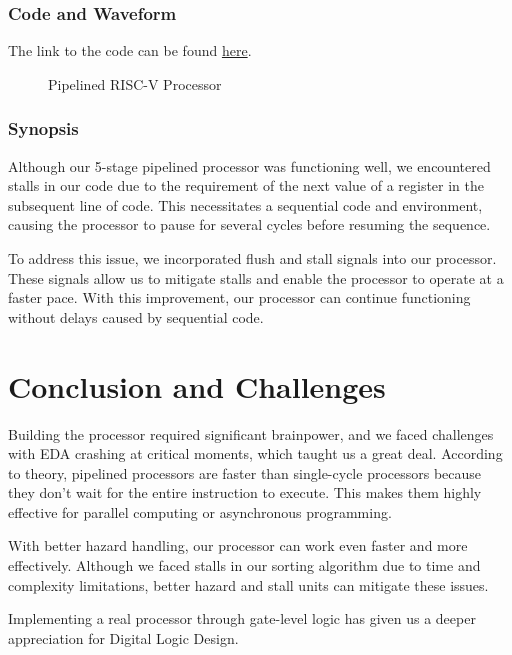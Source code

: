 \documentclass{report}
\begin{document}
\subsection{Code and Waveform}
The link to the code can be found \href{https://github.com/AliMuhammadAsad/Computer-Architecture-Spring-23/tree/main/RISC_V_Pipelined_Complete}{here}.
\begin{figure}[h]
    \centering
    \caption{Pipelined RISC-V Processor}
    \label{fig: Pipelined RISC_V Processor}
\end{figure}

\subsection{Synopsis}

Although our 5-stage pipelined processor was functioning well, we encountered stalls in our code due to the requirement of the next value of a register in the subsequent line of code. This necessitates a sequential code and environment, causing the processor to pause for several cycles before resuming the sequence.

To address this issue, we incorporated flush and stall signals into our processor. These signals allow us to mitigate stalls and enable the processor to operate at a faster pace. With this improvement, our processor can continue functioning without delays caused by sequential code.

\chapter{Conclusion and Challenges}

Building the processor required significant brainpower, and we faced challenges with EDA crashing at critical moments, which taught us a great deal. According to theory, pipelined processors are faster than single-cycle processors because they don't wait for the entire instruction to execute. This makes them highly effective for parallel computing or asynchronous programming.

With better hazard handling, our processor can work even faster and more effectively. Although we faced stalls in our sorting algorithm due to time and complexity limitations, better hazard and stall units can mitigate these issues.

Implementing a real processor through gate-level logic has given us a deeper appreciation for Digital Logic Design.
\end{document}

